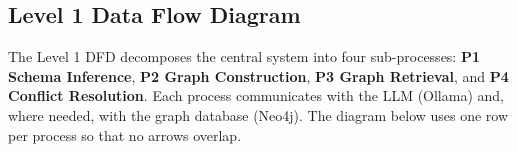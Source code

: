 \subsection{Level 1 Data Flow Diagram}

The Level 1 DFD decomposes the central system into four sub-processes:
\textbf{P1 Schema Inference}, \textbf{P2 Graph Construction}, \textbf{P3 Graph
Retrieval}, and \textbf{P4 Conflict Resolution}. Each process communicates
with the LLM (Ollama) and, where needed, with the graph database (Neo4j).
The diagram below uses one row per process so that no arrows overlap.

